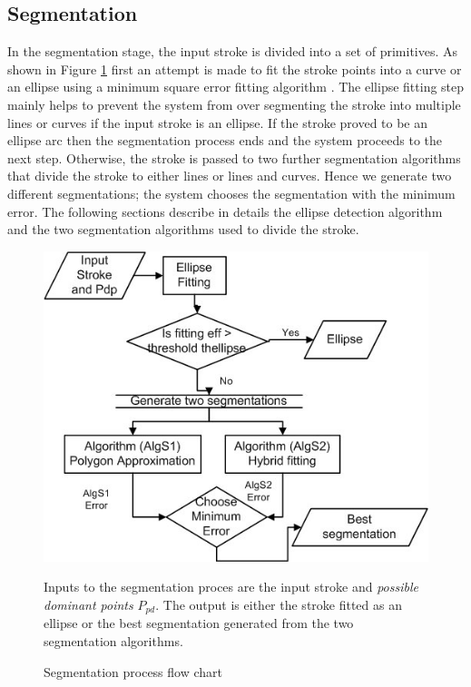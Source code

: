 \documentclass[preprint,10pt,5p,twocolumn]{elsarticle}
\begin{document}
\subsection{Segmentation}
\label{seg}
In the segmentation stage, the input stroke is divided into a set of primitives. As shown in Figure \ref{fig:segblock} first an attempt is made to fit the stroke points into a curve or an ellipse using a minimum square error fitting algorithm \cite{ellipsefit}. The ellipse fitting step mainly helps to prevent the system from over segmenting the stroke into multiple lines or curves if the input stroke is an ellipse. If the stroke proved to be an ellipse arc then the segmentation process ends and the system proceeds to the next step. Otherwise, the stroke is passed to two further segmentation algorithms that divide the stroke to either lines or lines and curves. Hence we generate two different segmentations; the system chooses the segmentation with the minimum error. The following sections describe in details the ellipse detection algorithm and the two segmentation algorithms used to divide the stroke. %
 \begin{figure}
	\centering
		\includegraphics[scale=0.48]{images/flowchart.jpg}
	\caption{Segmentation process flow chart} Inputs to the segmentation proces are the input stroke and \textit{possible dominant points} $P_{pd}$. The output is either the stroke fitted as an ellipse or the best segmentation generated from the two segmentation algorithms.  %
	\label{fig:segblock}
\end{figure}
\end{document}
